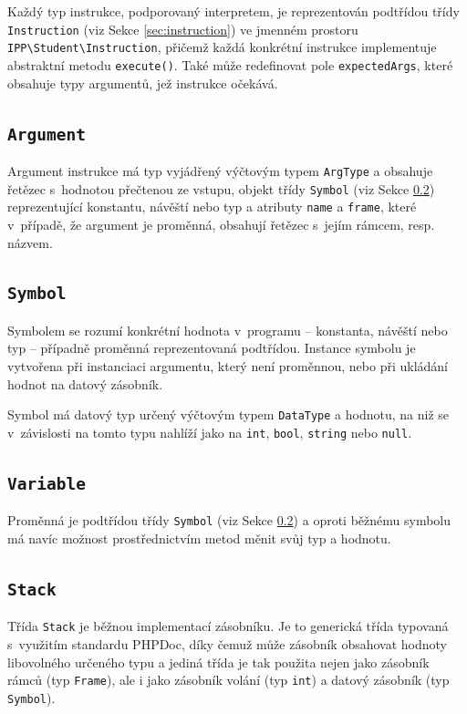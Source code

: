 \documentclass{article}[a4paper]
\begin{document}
    Každý typ instrukce, podporovaný interpretem, je reprezentován podtřídou třídy \texttt{Instruction} (viz Sekce \ref{sec:instruction}) ve jmenném prostoru \texttt{IPP\textbackslash Student\textbackslash Instruction}, přičemž každá konkrétní instrukce implementuje abstraktní metodu \texttt{execute()}.
    Také může redefinovat pole \texttt{expectedArgs}, které obsahuje typy argumentů, jež instrukce očekává.

    \subsection{\texttt{Argument}}

    Argument instrukce má typ vyjádřený výčtovým typem \texttt{ArgType} a obsahuje řetězec s~hodnotou přečtenou ze vstupu, objekt třídy \texttt{Symbol} (viz Sekce \ref{sec:symbol}) reprezentující
    konstantu, návěští nebo typ a atributy \texttt{name} a \texttt{frame}, které v~případě, že argument je proměnná, obsahují řetězec s~jejím rámcem, resp. názvem.

    \subsection{\texttt{Symbol}}
    \label{sec:symbol}

    Symbolem se rozumí konkrétní hodnota v~programu -- konstanta, návěští nebo typ -- případně proměnná reprezentovaná podtřídou.
    Instance symbolu je vytvořena při instanciaci argumentu, který není proměnnou, nebo při ukládání hodnot na datový zásobník.

    Symbol má datový typ určený výčtovým typem \texttt{DataType} a hodnotu, na niž se v~závislosti na tomto typu nahlíží jako na \texttt{int}, \texttt{bool}, \texttt{string} nebo \texttt{null}.

    \subsection{\texttt{Variable}}

    Proměnná je podtřídou třídy \texttt{Symbol} (viz Sekce \ref{sec:symbol}) a oproti běžnému symbolu má navíc možnost prostřednictvím metod měnit svůj typ a hodnotu.

    \subsection{\texttt{Stack}}

    Třída \texttt{Stack} je běžnou implementací zásobníku.
    Je to generická třída typovaná s~využitím standardu PHPDoc, díky čemuž může zásobník obsahovat hodnoty libovolného určeného typu a jediná třída je tak
    použita nejen jako zásobník rámců (typ \texttt{Frame}), ale i jako zásobník volání (typ \texttt{int}) a datový zásobník (typ \texttt{Symbol}).
\end{document}
